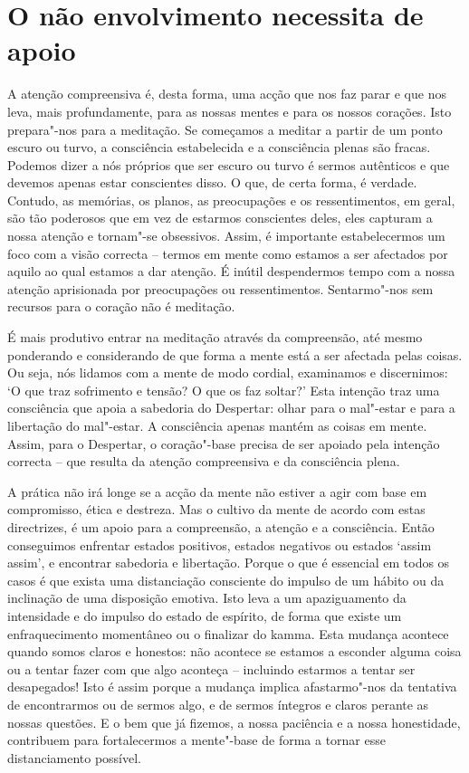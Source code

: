 \section{O não envolvimento necessita de apoio}

A atenção compreensiva é, desta forma, uma acção que nos faz parar e que nos
leva, mais profundamente, para as nossas mentes e para os nossos corações. Isto
prepara"-nos para a meditação. Se começamos a meditar a partir de um ponto escuro
ou turvo, a consciência estabelecida e a consciência plenas são fracas. Podemos
dizer a nós próprios que ser escuro ou turvo é sermos autênticos e que devemos
apenas estar conscientes disso. O que, de certa forma, é verdade. Contudo, as
memórias, os planos, as preocupações e os ressentimentos, em geral, são tão
poderosos que em vez de estarmos conscientes deles, eles capturam a nossa
atenção e tornam"-se obsessivos. Assim, é importante estabelecermos um foco com a
visão correcta -- termos em mente como estamos a ser afectados por aquilo ao
qual estamos a dar atenção. É inútil despendermos tempo com a nossa atenção
aprisionada por preocupações ou ressentimentos. Sentarmo"-nos sem recursos para o
coração não é meditação.

É mais produtivo entrar na meditação através da compreensão, até mesmo
ponderando e considerando de que forma a mente está a ser afectada pelas coisas.
Ou seja, nós lidamos com a mente de modo cordial, examinamos e discernimos: `O
que traz sofrimento e tensão? O que os faz soltar?' Esta intenção traz uma
consciência que apoia a sabedoria do Despertar: olhar para o mal"-estar e para a
libertação do mal"-estar. A consciência apenas mantém as coisas em mente. Assim,
para o Despertar, o coração"-base precisa de ser apoiado pela intenção correcta
-- que resulta da atenção compreensiva e da consciência plena.

\enlargethispage{\baselineskip}

A prática não irá longe se a acção da mente não estiver a agir com base em
compromisso, ética e destreza. Mas o cultivo da mente de acordo com estas
directrizes, é um apoio para a compreensão, a atenção e a consciência. Então
conseguimos enfrentar estados positivos, estados negativos ou estados `assim
assim', e encontrar sabedoria e libertação. Porque o que é essencial em todos os
casos é que exista uma distanciação consciente do impulso de um hábito ou da
inclinação de uma disposição emotiva. Isto leva a um apaziguamento da
intensidade e do impulso do estado de espírito, de forma que existe um
enfraquecimento momentâneo ou o finalizar do kamma. Esta mudança acontece quando
somos claros e honestos: não acontece se estamos a esconder alguma coisa ou a
tentar fazer com que algo aconteça -- incluindo estarmos a tentar ser
desapegados! Isto é assim porque a mudança implica afastarmo"-nos da tentativa de
encontrarmos ou de sermos algo, e de sermos íntegros e claros perante as nossas
questões. E o bem que já fizemos, a nossa paciência e a nossa honestidade,
contribuem para fortalecermos a mente"-base de forma a tornar esse distanciamento
possível.

